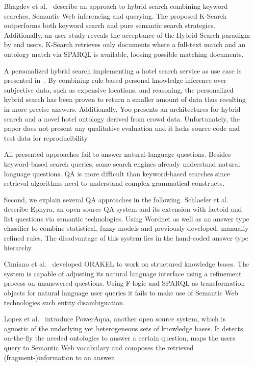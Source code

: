 Bhagdev et al.~\cite{Bhagdev:2008:HSE} describe an approach to hybrid search combining keyword searches, Semantic Web inferencing and querying. 
The proposed K-Search outperforms both keyword search and pure semantic search strategies.
Additionally, an user study reveals the acceptance of the Hybrid Search paradigm by end users.
K-Search retrieves only documents where a full-text match and an ontology match via SPARQL is available, loosing possible matching documents.

A personalized hybrid search implementing a  hotel search service as use case is presented in~\cite{DBLP:journals/kbs/Yoo12}. 
By combining rule-based personal knowledge inference over subjective data, such as expensive locations, and reasoning, the personalized hybrid search has been proven to return a smaller amount of data thus resulting in more precise answers. 
Additionally, Yoo presents an architectures for hybrid search and a novel hotel ontology derived from crowd data. 
Unfortunately, the paper does not present any qualitative evaluation and it lacks source code and test data for reproducibility. 

All presented approaches fail to answer natural-language questions.
Besides keyword-based search queries, some search engines already understand natural language questions. \ac{QA} is more difficult than keyword-based searches since retrieval algorithms need to understand complex grammatical constructs.


Second, we explain several QA approaches in the following.
{Schlaefer et al.~\cite{ephyra2007}} describe {Ephyra}, an open-source \ac{QA} system and its extension with factoid and list questions via semantic technologies.
Using Wordnet as well as an answer type classifier to combine statistical, fuzzy models and previously developed, manually refined rules. The disadvantage of this system lies in the hand-coded answer type hierarchy. %

Cimiano et al.~\cite{orakel} developed {ORAKEL} to work on structured knowledge bases.
The system is capable of adjusting its natural language interface using a refinement process on unanswered questions. 
Using F-logic and SPARQL as transformation objects for natural language user queries it fails to make use of Semantic Web technologies such entity disambiguation.

{Lopez et al.~\cite{poweraqua}} introduce {PowerAqua}, another open source system, which is agnostic of the underlying yet heterogeneous sets of knowledge bases. 
It detects on-the-fly the needed ontologies to answer a certain question, maps the users query to Semantic Web vocabulary and composes the retrieved (fragment-)information to an answer. 

